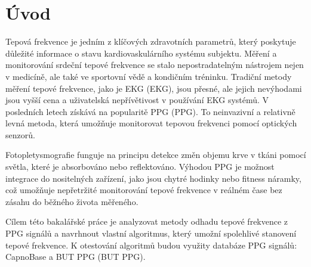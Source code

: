 \chapter*{Úvod}
{}

Tepová frekvence je jedním z klíčových zdravotních parametrů, který poskytuje důležité informace o
 stavu kardiovaskulárního systému subjektu.
Měření a monitorování srdeční tepové frekvence se stalo nepostradatelným nástrojem nejen v medicíně,
 ale také ve sportovní vědě a kondičním tréninku.
Tradiční metody měření tepové frekvence, jako je \acs{EKG} (\acl{EKG}), jsou přesné, ale jejich nevýhodami
 jsou vyšší cena a uživatelská nepřívětivost v používání \acs{EKG} systémů. 
V posledních letech získává na popularitě \acs{PPG} (\acl{PPG}).
To neinvazivní a relativně levná metoda, která umožňuje monitorovat tepovou frekvenci pomocí optických senzorů.

Fotopletysmografie funguje na principu detekce změn objemu krve v tkáni pomocí světla, které je absorbováno nebo reflektováno.
Výhodou \acs{PPG} je možnost integrace do nositelných zařízení, jako jsou chytré hodinky nebo fitness
 náramky, což umožňuje nepřetržité monitorování tepové frekvence v reálném čase bez zásahu do běžného života měřeného.

Cílem této bakalářské práce je analyzovat metody odhadu tepové frekvence z \acs{PPG} signálů a navrhnout vlastní algoritmus,
 který umožní spolehlivé stanovení tepové frekvence.
K otestování algoritmů budou využity databáze \acs{PPG} signálů: CapnoBase a \acs{BUT PPG} (\acl{BUT PPG}).


% 
% 
% 
